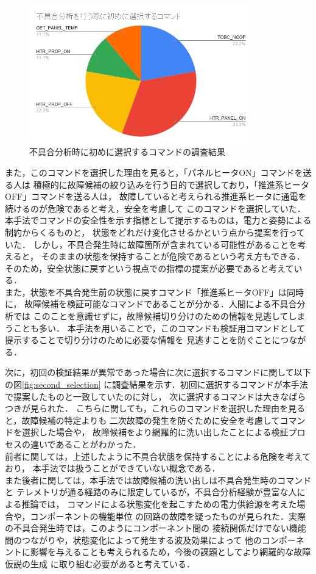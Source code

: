 \documentclass[11pt]{jsreport}
\begin{document}
\begin{figure}[H]
   \centering
      \includegraphics[height=6.0cm]{figure/first_selection.png}
      \caption{不具合分析時に初めに選択するコマンドの調査結果}
      \label{fig:first_selection}
\end{figure}
また，このコマンドを選択した理由を見ると，「パネルヒータON」コマンドを送る人は
積極的に故障候補の絞り込みを行う目的で選択しており，「推進系ヒータOFF」コマンドを送る人は，
故障していると考えられる推進系ヒータに通電を続けるのが危険であると考え，安全を考慮して
このコマンドを選択していた．
本手法でコマンドの安全性を示す指標として提示するものは，電力と姿勢による制約からくるものと，
状態をどれだけ変化させるかという点から提案を行っていた．
しかし，不具合発生時に故障箇所が含まれている可能性があることを考えると，
そのままの状態を保持することが危険であるという考え方もできる．
そのため，安全状態に戻すという視点での指標の提案が必要であると考えている．\\
また，状態を不具合発生前の状態に戻すコマンド「推進系ヒータOFF」は同時に，
故障候補を検証可能なコマンドであることが分かる．人間による不具合分析では
このことを意識せずに，故障候補切り分けのための情報を見逃してしまうことも多い．
本手法を用いることで，このコマンドも検証用コマンドとして提示することで切り分けのために必要な情報を
見逃すことを防ぐことにつながる．

次に，初回の検証結果が異常であった場合に次に選択するコマンドに関して以下の図\ref{fig:second_selection}
に調査結果を示す．初回に選択するコマンドが本手法で提案したものと一致していたのに対し，
次に選択するコマンドは大きなばらつきが見られた．
こちらに関しても，これらのコマンドを選択した理由を見ると，故障候補の特定よりも
二次故障の発生を防ぐために安全を考慮してコマンドを選択した場合や，
故障候補をより網羅的に洗い出したことによる検証プロセスの違いであることがわかった．\\
前者に関しては，上述したように不具合状態を保持することによる危険を考えており，
本手法では扱うことができていない概念である．\\
また後者に関しては，本手法では故障候補の洗い出しは不具合発生時のコマンドと
テレメトリが通る経路のみに限定しているが，不具合分析経験が豊富な人による推論では，
コマンドによる状態変化を起こすための電力供給源を考えた場合や，コンポーネントの機能単位
の回路の故障を疑ったものが見られた．実際の不具合発生時では，このようにコンポーネント間の
接続関係だけでない機能間のつながりや，状態変化によって発生する波及効果によって
他のコンポーネントに影響を与えることも考えられるため，今後の課題としてより網羅的な故障仮説の生成
に取り組む必要があると考えている．\\%
\end{document}
